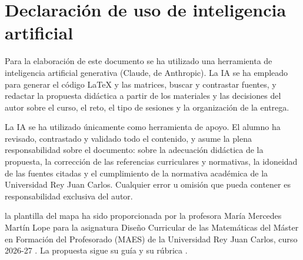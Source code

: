 \section*{Declaración de uso de inteligencia artificial}
Para la elaboración de este documento se ha utilizado una herramienta de inteligencia artificial generativa (Claude, de Anthropic). La IA se ha empleado para generar el código \LaTeX{} y las matrices, buscar y contrastar fuentes, y redactar la propuesta didáctica a partir de los materiales y las decisiones del autor sobre el curso, el reto, el tipo de sesiones y la organización de la entrega.

La IA se ha utilizado únicamente como herramienta de apoyo. El alumno ha revisado, contrastado y validado todo el contenido, y asume la plena responsabilidad sobre el documento: sobre la adecuación didáctica de la propuesta, la corrección de las referencias curriculares y normativas, la idoneidad de las fuentes citadas y el cumplimiento de la normativa académica de la Universidad Rey Juan Carlos. Cualquier error u omisión que pueda contener es responsabilidad exclusiva del autor.

 la plantilla del mapa ha sido proporcionada por la profesora María Mercedes Martín Lope para la asignatura Diseño Curricular de las Matemáticas del Máster en Formación del Profesorado (MAES) de la Universidad Rey Juan Carlos, curso 2026-27 \parencite{plantilla}. La propuesta sigue su guía y su rúbrica \parencite{guia,rubrica}.
